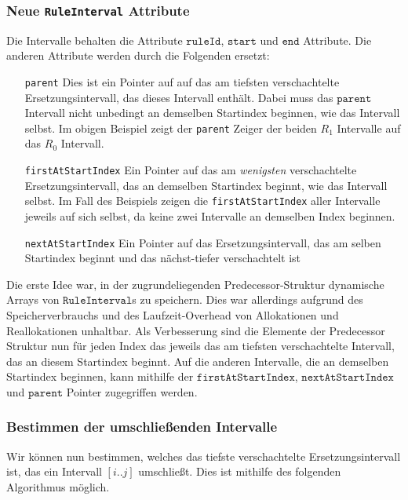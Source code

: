 \subsubsection{Neue \texttt{RuleInterval} Attribute}

Die Intervalle behalten die Attribute $\texttt{ruleId}$, $\texttt{start}$ und $\texttt{end}$ Attribute. Die anderen Attribute werden durch die Folgenden ersetzt:

\begin{itemize}[leftmargin=3cm]
    \item[\texttt{parent}] Dies ist ein Pointer auf auf das am tiefsten verschachtelte Ersetzungsintervall, das dieses Intervall enthält. Dabei muss das $\texttt{parent}$ Intervall nicht unbedingt an demselben Startindex beginnen, wie das Intervall selbst. Im obigen Beispiel zeigt der \texttt{parent} Zeiger der beiden $R_1$ Intervalle auf das $R_0$ Intervall.
    \item[\texttt{firstAtStartIndex}] Ein Pointer auf das am \textit{wenigsten} verschachtelte Ersetzungsintervall, das an demselben Startindex beginnt, wie das Intervall selbst. Im Fall des Beispiels zeigen die \texttt{firstAtStartIndex} aller Intervalle jeweils auf sich selbst, da keine zwei Intervalle an demselben Index beginnen.
    \item[\texttt{nextAtStartIndex}] Ein Pointer auf das Ersetzungsintervall, das am selben Startindex beginnt und das nächst-tiefer verschachtelt ist
\end{itemize}

Die erste Idee war, in der zugrundeliegenden Predecessor-Struktur dynamische Arrays von $\texttt{RuleInterval}$s zu speichern. Dies war allerdings aufgrund des Speicherverbrauchs und des Laufzeit-Overhead von Allokationen und Reallokationen unhaltbar. Als Verbesserung sind die Elemente der Predecessor Struktur nun für jeden Index das jeweils das am tiefsten verschachtelte Intervall, das an diesem Startindex beginnt. Auf die anderen Intervalle, die an demselben Startindex beginnen, kann mithilfe der $\texttt{firstAtStartIndex}$, $\texttt{nextAtStartIndex}$ und $\texttt{parent}$ Pointer zugegriffen werden.

\subsubsection{Bestimmen der umschließenden Intervalle}
Wir können nun bestimmen, welches das tiefste verschachtelte Ersetzungsintervall ist, das ein Intervall $[i..j]$ umschließt.
Dies ist mithilfe des folgenden Algorithmus möglich.

